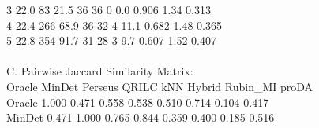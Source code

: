 \documentclass[11pt,oneside]{book}
\begin{document}
\begin{routput}
3 \hspace*{1.2em}22.0 \hspace*{2.5em}83 \hspace*{2em}21.5 \hspace*{4em}36 \hspace*{1.5em}36 \hspace*{1em}0 \hspace*{2.2em}0.0 \hspace*{2em}0.906 \hspace*{1em}1.34 \hspace*{0.8em}0.313\\
4 \hspace*{1.2em}22.4 \hspace*{2em}266 \hspace*{2em}68.9 \hspace*{4em}36 \hspace*{1.5em}32 \hspace*{1em}4 \hspace*{1.8em}11.1 \hspace*{2em}0.682 \hspace*{1em}1.48 \hspace*{0.8em}0.365\\
5 \hspace*{1.2em}22.8 \hspace*{2em}354 \hspace*{2em}91.7 \hspace*{4em}31 \hspace*{1.5em}28 \hspace*{1em}3 \hspace*{2.2em}9.7 \hspace*{2em}0.607 \hspace*{1em}1.52 \hspace*{0.8em}0.407\\
\\
C. Pairwise Jaccard Similarity Matrix:\\
\hspace*{5em}Oracle MinDet Perseus QRILC \hspace*{0.5em}kNN Hybrid Rubin\_MI proDA\\
Oracle \hspace*{2.2em}1.000 \hspace*{0.8em}0.471 \hspace*{1.2em}0.558 0.538 0.510 \hspace*{1em}0.714 \hspace*{1.5em}0.104 0.417\\
MinDet \hspace*{2.2em}0.471 \hspace*{0.8em}1.000 \hspace*{1.2em}0.765 0.844 0.359 \hspace*{1em}0.400 \hspace*{1.5em}0.185 0.516\\

\end{routput}
\end{document}
